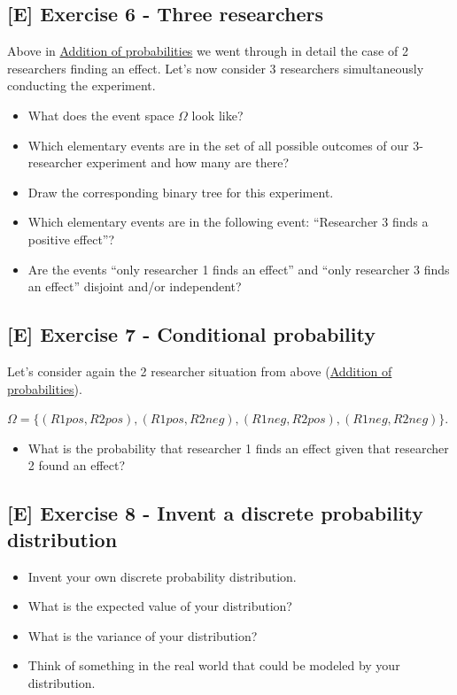 \documentclass[
]{book}
\providecommand{\tightlist}{%
  \setlength{\itemsep}{0pt}\setlength{\parskip}{0pt}}
\begin{document}
\subsection{{[}E{]} Exercise 6 - Three researchers}\label{exercise6}

Above in \hyperref[addition_of_probabilities]{Addition of probabilities} we went through in detail the case of 2 researchers finding an effect.
Let's now consider 3 researchers simultaneously conducting the experiment.

\begin{itemize}
\tightlist
\item
  What does the event space \(\Omega\) look like?
\item
  Which elementary events are in the set of all possible outcomes of our 3-researcher experiment and how many are there?
\item
  Draw the corresponding binary tree for this experiment.
\item
  Which elementary events are in the following event: ``Researcher 3 finds a positive effect''?
\item
  Are the events ``only researcher 1 finds an effect'' and ``only researcher 3 finds an effect'' disjoint and/or independent?
\end{itemize}

\subsection{{[}E{]} Exercise 7 - Conditional probability}\label{exercise7}

Let's consider again the 2 researcher situation from above (\hyperref[addition_of_probabilities]{Addition of probabilities}).

\(\Omega = \{ (R1pos, R2pos), (R1pos, R2neg), (R1neg, R2pos), (R1neg, R2neg) \}\).

\begin{itemize}
\tightlist
\item
  What is the probability that researcher 1 finds an effect given that researcher 2 found an effect?
\end{itemize}

\subsection{{[}E{]} Exercise 8 - Invent a discrete probability distribution}\label{exercise8}

\begin{itemize}
\tightlist
\item
  Invent your own discrete probability distribution.
\item
  What is the expected value of your distribution?
\item
  What is the variance of your distribution?
\item
  Think of something in the real world that could be modeled by your distribution.
\end{itemize}
\end{document}
